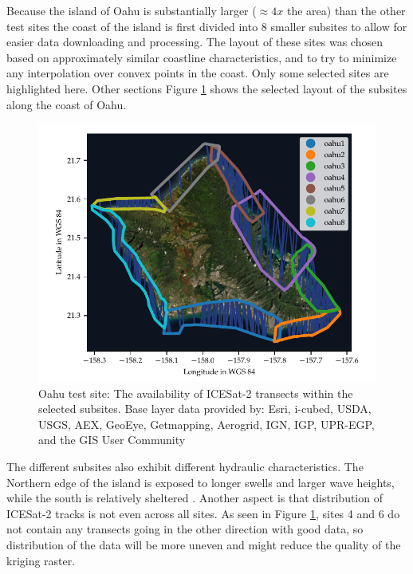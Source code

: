 Because the island of Oahu is substantially larger ($\approx 4x$ the area) than the other test sites the coast of the island is first divided into 8 smaller subsites to allow for easier data downloading and processing. The layout of these sites was chosen based on approximately similar coastline characteristics, and to try to minimize any interpolation over convex points in the coast. Only some selected sites are highlighted here. Other sections  Figure \ref{fig:oahu-subsite-layout} shows the selected layout of the subsites along the coast of Oahu.

\begin{figure}[htbp]
    \centering
    \includegraphics{figures/Oahu_all_tracklines.pdf}
    \caption[Oahu test site: Transects and subsite layout]{Oahu test site: The availability of ICESat-2 transects within the selected subsites. Base layer data provided by: Esri, i-cubed, USDA, USGS, AEX, GeoEye, Getmapping, Aerogrid, IGN, IGP, UPR-EGP, and the GIS User Community}
    \label{fig:oahu-subsite-layout}
\end{figure}

The different subsites also exhibit different hydraulic characteristics. The Northern edge of the island is exposed to longer swells and larger wave heights, while the south is relatively sheltered \parencite{Vitousek2008a}. Another aspect is that distribution of ICESat-2 tracks is not even across all sites. As seen in Figure \ref{fig:oahu-subsite-layout}, sites 4 and 6 do not contain any transects going in the other direction with good data, so distribution of the data will be more uneven and might reduce the quality of the kriging raster.

